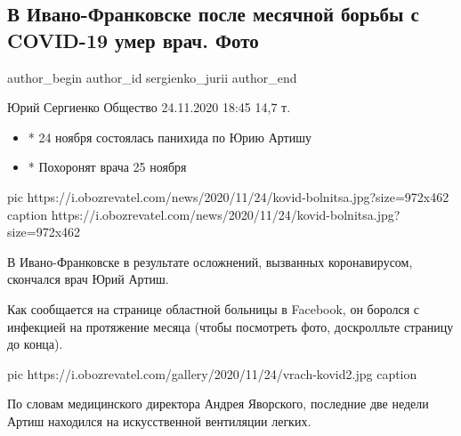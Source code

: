  
 
 
 
 
 
\subsection{В Ивано-Франковске после месячной борьбы с COVID-19 умер врач. Фото}
\label{sec:24_11_2020.news.ua.obozrevatel.sergienko_jurii.1.death_kovid_vrach_ivano_frankovsk}
\ifcmt
	author_begin
   author_id sergienko_jurii
	author_end
\fi

Юрий Сергиенко Общество 24.11.2020 18:45 14,7 т. 


\begin{itemize}
  \item * 24 ноября состоялась панихида по Юрию Артишу
  \item * Похоронят врача 25 ноября
\end{itemize}

\ifcmt
pic https://i.obozrevatel.com/news/2020/11/24/kovid-bolnitsa.jpg?size=972x462
caption https://i.obozrevatel.com/news/2020/11/24/kovid-bolnitsa.jpg?size=972x462
\fi


В Ивано-Франковске в результате осложнений, вызванных коронавирусом,
скончался врач Юрий Артиш.

Как сообщается на странице областной больницы в Facebook, он боролся с
инфекцией на протяжение месяца (чтобы посмотреть фото, доскролльте
страницу до конца).

\ifcmt
pic https://i.obozrevatel.com/gallery/2020/11/24/vrach-kovid2.jpg
caption 
\fi

По словам медицинского директора Андрея Яворского, последние две недели
Артиш находился на искусственной вентиляции легких.

